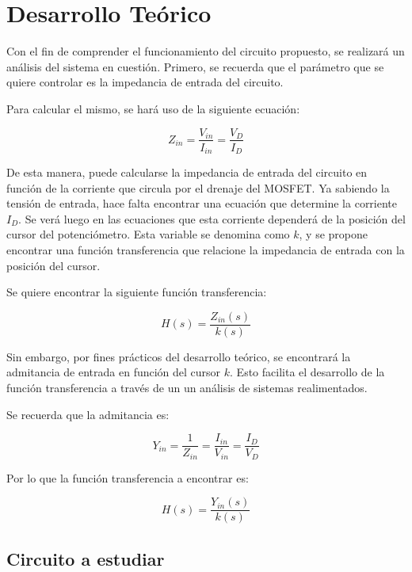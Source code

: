 \documentclass[12pt,oneside,a4paper]{article}
\begin{document}
\section{Desarrollo Teórico}
Con el fin de comprender el funcionamiento del circuito propuesto, se realizará un análisis del sistema 
en cuestión. Primero, se recuerda que el parámetro que se quiere controlar es la impedancia de entrada 
del circuito. 

Para calcular el mismo, se hará uso de la siguiente ecuación: 

\begin{equation}
    Z_{in} = \frac{V_{in}}{I_{in}} = \frac{V_D}{I_{D}}
\end{equation}

De esta manera, puede calcularse la impedancia de entrada del circuito en función de la corriente que circula 
por el drenaje del MOSFET. Ya sabiendo la tensión de entrada, hace falta encontrar una ecuación que determine 
la corriente $I_D$. Se verá luego en las ecuaciones que esta corriente dependerá de la posición del cursor 
del potenciómetro. Esta variable se denomina como $k$, y se propone encontrar una función transferencia que 
relacione la impedancia de entrada con la posición del cursor. 

\newpage

Se quiere encontrar la siguiente función transferencia:

\begin{equation}
    H(s) = \frac{Z_{in}(s)}{k(s)}
\end{equation}

Sin embargo, por fines prácticos del desarrollo teórico, se encontrará la admitancia de entrada en función 
del cursor $k$. Esto facilita el desarrollo de la función transferencia a través de un 
un análisis de sistemas realimentados.

Se recuerda que la admitancia es:

\begin{equation}
    Y_{in} = \frac{1}{Z_{in}} = \frac{I_{in}}{V_{in}} = \frac{I_{D}}{V_{D}}
\end{equation}

Por lo que la función transferencia a encontrar es:

\begin{equation}
    H(s) = \frac{Y_{in}(s)}{k(s)}
\end{equation} 

\subsection*{Circuito a estudiar}
\end{document}

